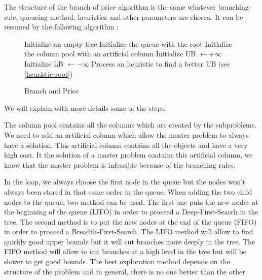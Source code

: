 The structure of the branch of price algorithm is the same whatever branching-rule, queueing method, heuristics and other parameters are chosen. It can be resumed by the following algorithm :

\begin{figure}[!ht]
	\centering
	\begin{minipage}{0.9\linewidth}
		\begin{algorithm}[H]
			\DontPrintSemicolon 
			\SetAlgoLined
			Initialize an empty tree\;
			Initialize the queue with the root\;
			Initialize the column pool with an artificial column\;
			Initialize UB $\leftarrow +\infty$\;
			Initialize LB $\leftarrow -\infty$\;
			Process an heuristic to find a better UB (see \ref{heuristic-root})\;
			\caption{Branch and Price}
		\end{algorithm}
	\end{minipage}
\end{figure}
\noindent We will explain with more details some of the steps.

The column pool contains all the columns which are created by the subproblems. We need to add an artificial column which allow the master problem to always have a solution. This artificial column contains all the objects and have a very high cost. It the solution of a master problem contains this artificial column, we know that the master problem is infeasible because of the branching rules.

In the loop, we always choose the first node in the queue but the nodes won't always been stored in that same order in the queue. When adding the two child nodes to the queue, two method can be used. The first one puts the new nodes at the beginning of the queue (LIFO) in order to proceed a Deep-First-Search in the tree. The second method is to put the new nodes at the end of the queue (FIFO) in order to proceed a Breadth-First-Search. The LIFO method will allow to find quickly good upper bounds but it will cut branches more deeply in the tree. The FIFO method will allow to cut branches at a high level in the tree but will be slower to get good bounds. The best exploration method depends on the structure of the problem and in general, there is no one better than the other.

